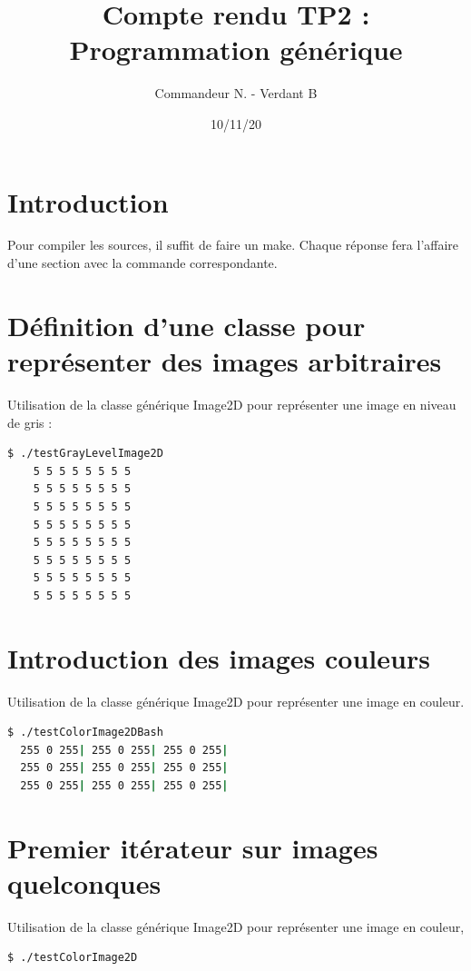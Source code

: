 \documentclass[a4paper,10pt]{article}
\title{Compte rendu TP2 : Programmation générique}
\date{10/11/20}
\author{Commandeur N. - Verdant B}
\begin{document}
\maketitle
{}
\newpage

  \section{Introduction}
  Pour compiler les sources, il suffit de faire un make. Chaque réponse fera l'affaire d'une section avec la commande correspondante.


  \section{Définition d'une classe pour représenter des images arbitraires}
  Utilisation de la classe générique Image2D pour représenter une image en niveau de gris :
  \begin{lstlisting}[language=Bash]
  $ ./testGrayLevelImage2D  
    5 5 5 5 5 5 5 5
    5 5 5 5 5 5 5 5
    5 5 5 5 5 5 5 5
    5 5 5 5 5 5 5 5
    5 5 5 5 5 5 5 5
    5 5 5 5 5 5 5 5
    5 5 5 5 5 5 5 5
    5 5 5 5 5 5 5 5
  \end{lstlisting}
  \section{Introduction des images couleurs}
  Utilisation de la classe générique Image2D pour représenter une image en couleur.
  \begin{lstlisting}[language=Bash]
  $ ./testColorImage2DBash
  255 0 255| 255 0 255| 255 0 255| 
  255 0 255| 255 0 255| 255 0 255| 
  255 0 255| 255 0 255| 255 0 255| 
  \end{lstlisting}
    \pagebreak
    \section{Premier itérateur sur images quelconques}
     Utilisation de la classe générique Image2D pour représenter une image en couleur,
  \begin{lstlisting}[language=Bash]
  $ ./testColorImage2D
  \end{lstlisting}
\end{document}
